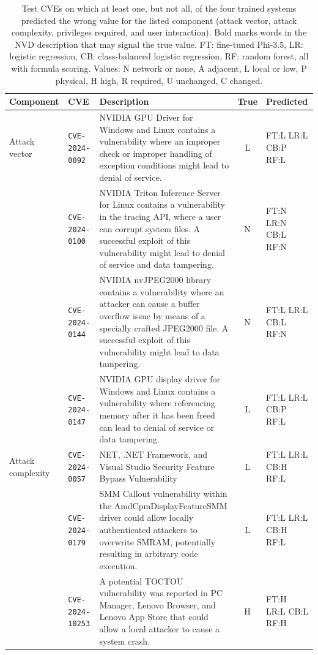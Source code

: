 \begin{table}[p]
\centering
\caption{Test CVEs on which at least one, but not all, of the four trained systems predicted the wrong value for the listed component (attack vector, attack complexity, privileges required, and user interaction). Bold marks words in the NVD description that may signal the true value. FT: fine-tuned Phi-3.5, LR: logistic regression, CB: class-balanced logistic regression, RF: random forest, all with formula scoring. Values: N network or none, A adjacent, L local or low, P physical, H high, R required, U unchanged, C changed.}
\label{tab:qualsomea}
\scriptsize
\setlength{\tabcolsep}{3pt}
\begin{tabular}{@{}llp{6.2cm}cl@{}}
\toprule
Component & CVE & Description & True & Predicted \\
\midrule
Attack vector & \texttt{CVE-2024-0092} & NVIDIA GPU Driver for Windows and Linux contains a vulnerability where an improper check or improper handling of exception conditions might lead to denial of service. & L & FT:L LR:L CB:P RF:L \\
 & \texttt{CVE-2024-0100} & NVIDIA Triton Inference Server for Linux contains a vulnerability in the tracing API, where a user can corrupt system files. A successful exploit of this vulnerability might lead to denial of service and data tampering. & N & FT:N LR:N CB:L RF:N \\
 & \texttt{CVE-2024-0144} & NVIDIA nvJPEG2000 library contains a vulnerability where an attacker can cause a buffer overflow issue by means of a specially crafted JPEG2000 file. A successful exploit of this vulnerability might lead to data tampering. & N & FT:L LR:L CB:L RF:N \\
 & \texttt{CVE-2024-0147} & NVIDIA GPU display driver for Windows and Linux contains a vulnerability where referencing memory after it has been freed can lead to denial of service or data tampering. & L & FT:L LR:L CB:P RF:L \\
\addlinespace[3pt]
Attack complexity & \texttt{CVE-2024-0057} & NET, .NET Framework, and Visual Studio Security Feature Bypass Vulnerability & L & FT:L LR:L CB:H RF:L \\
 & \texttt{CVE-2024-0179} & SMM Callout vulnerability within the AmdCpmDisplayFeatureSMM driver could allow locally authenticated attackers to overwrite SMRAM, potentially resulting in arbitrary code execution. & L & FT:L LR:L CB:H RF:L \\
 & \texttt{CVE-2024-10253} & A potential TOCTOU vulnerability was reported in PC Manager, Lenovo Browser, and Lenovo App Store that could allow a local attacker to cause a system crash. & H & FT:H LR:L CB:L RF:H \\

\end{tabular}
\end{table}
